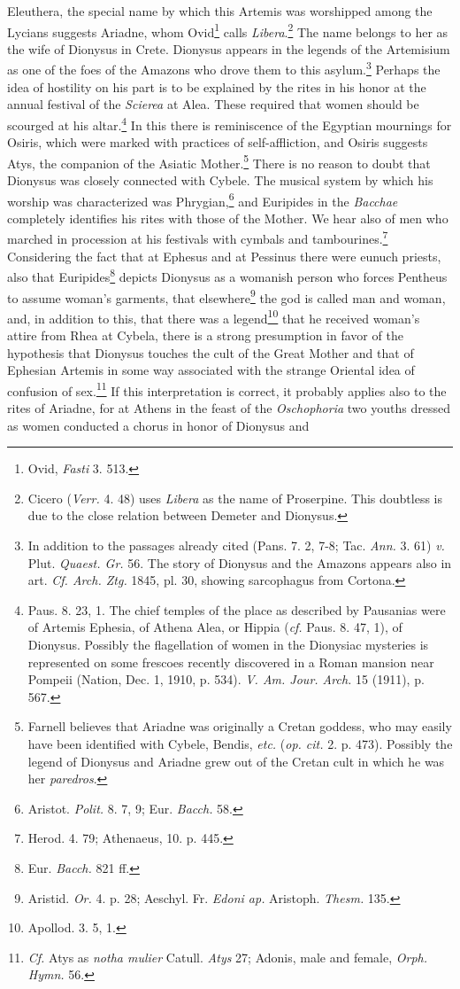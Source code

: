 \documentclass[a4paper, 12pt, oneside]{article}
\begin{document}
Eleuthera, the special name by which this Artemis was worshipped among the Lycians suggests Ariadne, whom Ovid\footnote{Ovid, \emph{Fasti} 3. 513.} calls \emph{Libera}.\footnote{Cicero (\emph{Verr.} 4. 48) uses \emph{Libera} as the name of Proserpine. This doubtless is due to the close relation between Demeter and Dionysus.} The name belongs to her as the wife of Dionysus in Crete. Dionysus appears in the legends of the Artemisium as one of the foes of the Amazons who drove them to this asylum.\footnote{In addition to the passages already cited (Pans. 7. 2, 7-8; Tac. \emph{Ann.} 3. 61) \emph{v.} Plut. \emph{Quaest. Gr.} 56. The story of Dionysus and the Amazons appears also in art. \emph{Cf. Arch. Ztg.} 1845, pl. 30, showing sarcophagus from Cortona.} Perhaps the idea of hostility on his part is to be explained by the rites in his honor at the annual festival of the \emph{Scierea} at Alea. These required that women should be scourged at his altar.\footnote{Paus. 8. 23, 1. The chief temples of the place as described by Pausanias were of Artemis Ephesia, of Athena Alea, or Hippia (\emph{cf.} Paus. 8. 47, 1), of Dionysus. Possibly the flagellation of women in the Dionysiac mysteries is represented on some frescoes recently discovered in a Roman mansion near Pompeii (Nation, Dec. 1, 1910, p. 534). \emph{V. Am. Jour. Arch.} 15 (1911), p. 567.} In this there is reminiscence of the Egyptian mournings for Osiris, which were marked with practices of self-affliction, and Osiris suggests Atys, the companion of the Asiatic Mother.\footnote{Farnell believes that Ariadne was originally a Cretan goddess, who may easily have been identified with Cybele, Bendis, \emph{etc.} (\emph{op. cit.} 2. p. 473). Possibly the legend of Dionysus and Ariadne grew out of the Cretan cult in which he was her \emph{paredros}.} There is no reason to doubt that Dionysus was closely connected with Cybele. The musical system by which his worship was characterized was Phrygian,\footnote{Aristot. \emph{Polit.} 8. 7, 9; Eur. \emph{Bacch.} 58.} and Euripides in the \emph{Bacchae} completely identifies his rites with those of the Mother. We hear also of men who marched in procession at his festivals with cymbals and tambourines.\footnote{Herod. 4. 79; Athenaeus, 10. p. 445.} Considering the fact that at Ephesus and at Pessinus there were eunuch priests, also that Euripides\footnote{Eur. \emph{Bacch.} 821 ff.} depicts Dionysus as a womanish person who forces Pentheus to assume woman's garments, that elsewhere\footnote{Aristid. \emph{Or.} 4. p. 28; Aeschyl. Fr. \emph{Edoni ap.} Aristoph. \emph{Thesm.} 135.} the god is called man and woman, and, in addition to this, that there was a legend\footnote{Apollod. 3. 5, 1.} that he received woman's attire from Rhea at Cybela, there is a strong presumption in favor of the hypothesis that Dionysus touches the cult of the Great Mother and that of Ephesian Artemis in some way associated with the strange Oriental idea of confusion of sex.\footnote{\emph{Cf.} Atys as \emph{notha mulier} Catull. \emph{Atys} 27; Adonis, male and female, \emph{Orph. Hymn.} 56.} If this interpretation is correct, it probably applies also to the rites of Ariadne, for at Athens in the feast of the \emph{Oschophoria} two youths dressed as women conducted a chorus in honor of Dionysus and 
\end{document}
